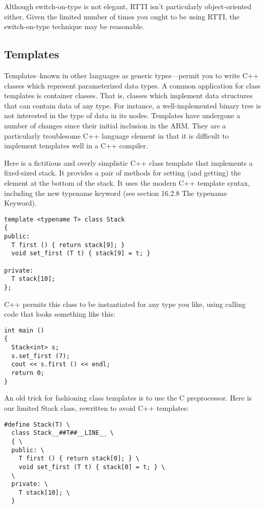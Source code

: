 Although switch-on-type is not elegant, RTTI isn't particularly object-oriented either. Given the limited number of times you ought to be using RTTI, the switch-on-type technique may be reasonable.

\subsection{Templates}

Templates--known in other languages as generic types---permit you to write C++ classes which represent parameterized data types. A common application for class templates is container classes. That is, classes which implement data structures that can contain data of any type. For instance, a well-implemented binary tree is not interested in the type of data in its nodes. Templates have undergone a number of changes since their initial inclusion in the ARM. They are a particularly troublesome C++ language element in that it is difficult to implement templates well in a C++ compiler.

Here is a fictitious and overly simplistic C++ class template that implements a fixed-sized stack. It provides a pair of methods for setting (and getting) the element at the bottom of the stack. It uses the modern C++ template syntax, including the new typename keyword (see section 16.2.8 The typename Keyword). 

\begin{Verbatim}[frame=single]
template <typename T> class Stack
{
public:
  T first () { return stack[9]; }
  void set_first (T t) { stack[9] = t; }

private:
  T stack[10];
};
\end{Verbatim}

C++ permits this class to be instantiated for any type you like, using calling code that looks something like this:

\begin{verbatim}
int main ()
{
  Stack<int> s;
  s.set_first (7);
  cout << s.first () << endl;
  return 0;
}
\end{verbatim}

An old trick for fashioning class templates is to use the C preprocessor. Here is our limited Stack class, rewritten to avoid C++ templates: 

\begin{Verbatim}[frame=single]
#define Stack(T) \
  class Stack__##T##__LINE__ \
  { \
  public: \
    T first () { return stack[0]; } \
    void set_first (T t) { stack[0] = t; } \
  \
  private: \
    T stack[10]; \
  }
\end{Verbatim}


